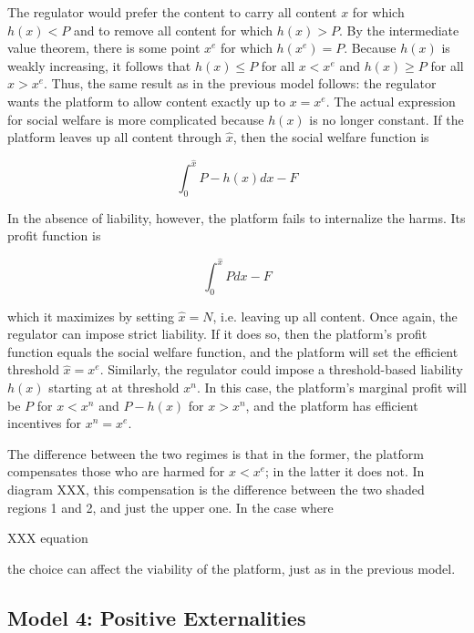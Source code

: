
The regulator would prefer the content to carry all content $x$ for which $h(x) <P$ and to remove all content for which $h(x) > P$. By the intermediate value theorem, there is some point $x^e$ for which $h(x^e) = P$. Because $h(x)$ is weakly increasing, it follows that $h(x) \le P$ for all $x< x^e$ and $h(x) \ge P$ for all $x > x^e$. Thus, the same result as in the previous model follows: the regulator wants the platform to allow content exactly up to $x = x^e$. The actual expression for social welfare is more complicated because $h(x)$ is no longer constant. If the platform leaves up all content through $\hat{x}$, then the social welfare function is

\begin{equation}
\int_{0}^{\hat{x}} P - h(x) dx - F
\end{equation}

In the absence of liability, however, the platform fails to internalize the harms. Its profit function is 

\begin{equation}
\int_{0}^{\hat{x}} P dx - F
\end{equation}

which it maximizes by setting $\hat{x} = N$, i.e. leaving up all content. Once again, the regulator can impose strict liability. If it does so, then the platform's profit function equals the social welfare function, and the platform will set the efficient threshold $\hat{x} = x^e$. Similarly, the regulator could impose a threshold-based liability $h(x)$ starting at at threshold $x^n$. In this case, the platform's marginal profit will be $P$ for $x < x^n$ and $P - h(x)$ for $x > x^n$, and the platform has efficient incentives for $x^n = x^e$. 

The difference between the two regimes is that in the former, the platform compensates those who are harmed for $x < x^e$; in the latter it does not. In diagram XXX, this compensation is the difference between the two shaded regions 1 and 2, and just the upper one. In the case where

XXX equation

the choice can affect the viability of the platform, just as in the previous model.

\subsection{Model 4: Positive Externalities}

